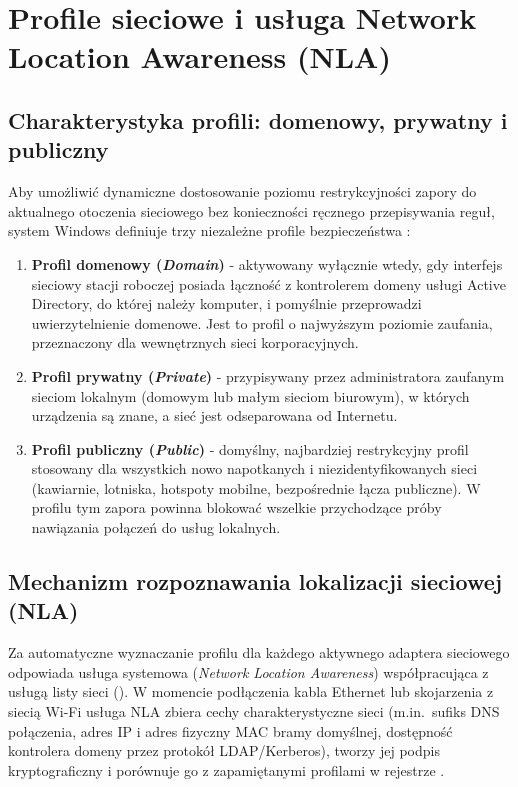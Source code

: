 \section{Profile sieciowe i usługa Network Location Awareness (NLA)}\label{sec:profile-sieciowe}

\subsection{Charakterystyka profili: domenowy, prywatny i publiczny}\label{subsec:charakterystyka-profili}

Aby umożliwić dynamiczne dostosowanie poziomu restrykcyjności zapory do aktualnego otoczenia sieciowego bez konieczności ręcznego przepisywania reguł, system Windows definiuje trzy niezależne profile bezpieczeństwa \cite{ms-defender-firewall}:
\begin{enumerate}
    \item \textbf{Profil domenowy (\textit{Domain})} - aktywowany wyłącznie wtedy, gdy interfejs sieciowy stacji roboczej posiada łączność z kontrolerem domeny usługi Active Directory, do której należy komputer, i pomyślnie przeprowadzi uwierzytelnienie domenowe. Jest to profil o najwyższym poziomie zaufania, przeznaczony dla wewnętrznych sieci korporacyjnych.
    \item \textbf{Profil prywatny (\textit{Private})} - przypisywany przez administratora zaufanym sieciom lokalnym (domowym lub małym sieciom biurowym), w których urządzenia są znane, a sieć jest odseparowana od Internetu.
    \item \textbf{Profil publiczny (\textit{Public})} - domyślny, najbardziej restrykcyjny profil stosowany dla wszystkich nowo napotkanych i niezidentyfikowanych sieci (kawiarnie, lotniska, hotspoty mobilne, bezpośrednie łącza publiczne). W profilu tym zapora powinna blokować wszelkie przychodzące próby nawiązania połączeń do usług lokalnych.
\end{enumerate}

\subsection{Mechanizm rozpoznawania lokalizacji sieciowej (NLA)}\label{subsec:mechanizm-nla}

Za automatyczne wyznaczanie profilu dla każdego aktywnego adaptera sieciowego odpowiada usługa systemowa  (\textit{Network Location Awareness}) współpracująca z usługą listy sieci (). W momencie podłączenia kabla Ethernet lub skojarzenia z siecią Wi-Fi usługa NLA zbiera cechy charakterystyczne sieci (m.in.\ sufiks DNS połączenia, adres IP i adres fizyczny MAC bramy domyślnej, dostępność kontrolera domeny przez protokół LDAP/Kerberos), tworzy jej podpis kryptograficzny i porównuje go z zapamiętanymi profilami w rejestrze .

